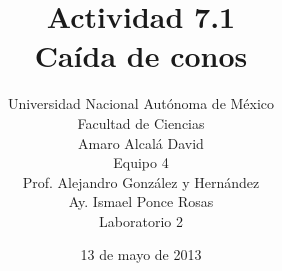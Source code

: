 \documentclass[12pt,a4paper]{article}
\date{13 de mayo de 2013}
\title{Actividad 7.1\\
    Caída de conos\\
}
\author{Universidad Nacional Autónoma de México \\
    Facultad de Ciencias \\
    Amaro Alcalá David \\
    Equipo 4 \\
    Prof. Alejandro González y Hernández\\
    Ay. Ismael Ponce Rosas\\
    Laboratorio 2\\
    }
\begin{document}
        
    \begin{multicols}{2}
    \end{multicols}
\end{document}
